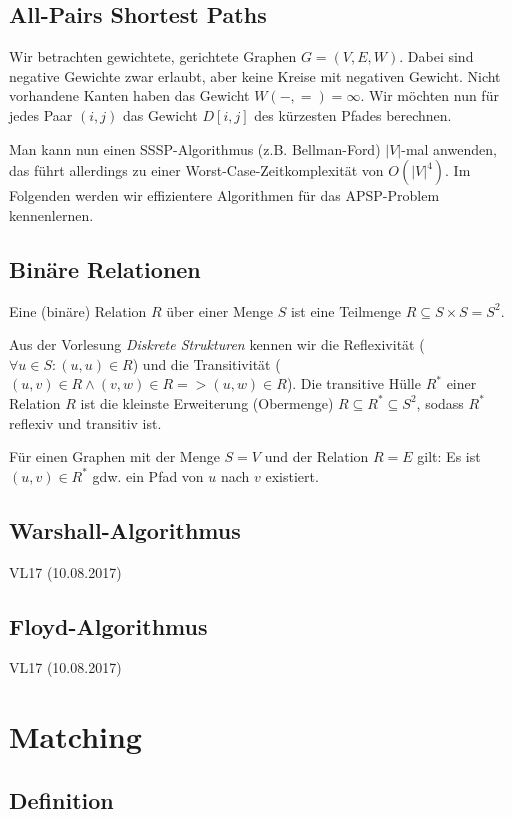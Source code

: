 \documentclass[12pt]{article}
\begin{document}
\subsection{All-Pairs Shortest Paths}

Wir betrachten gewichtete, gerichtete Graphen $G = (V, E, W)$. Dabei sind negative Gewichte zwar erlaubt, aber keine Kreise mit negativen Gewicht. Nicht vorhandene Kanten haben das Gewicht $W(-,=) = \infty$. Wir möchten nun für jedes Paar $(i, j)$ das Gewicht $D[i,j]$ des kürzesten Pfades berechnen.

Man kann nun einen SSSP-Algorithmus (z.B. Bellman-Ford) $|V|$-mal anwenden, das führt allerdings zu einer Worst-Case-Zeitkomplexität von $O(|V|^4)$. Im Folgenden werden wir effizientere Algorithmen für das APSP-Problem kennenlernen.

\subsection{Binäre Relationen}

Eine (binäre) Relation $R$ über einer Menge $S$ ist eine Teilmenge $R \subseteq S \times S = S^2$.

Aus der Vorlesung \textit{Diskrete Strukturen} kennen wir die Reflexivität ($\forall u \in S : (u, u) \in R$) und die Transitivität ($(u, v) \in R \land (v, w) \in R => (u, w) \in R$). Die transitive Hülle $R^*$ einer Relation $R$ ist die kleinste Erweiterung (Obermenge) $R \subseteq R^* \subseteq S^2$, sodass $R^*$ reflexiv und transitiv ist.

Für einen Graphen mit der Menge $S = V$ und der Relation $R = E$ gilt: Es ist $(u, v) \in R^*$ gdw. ein Pfad von $u$ nach $v$ existiert.

\subsection{Warshall-Algorithmus}

VL17 (10.08.2017)

\subsection{Floyd-Algorithmus}

VL17 (10.08.2017)

\section{Matching}

\subsection{Definition}
\end{document}
